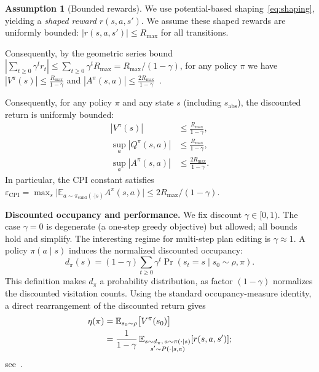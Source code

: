 \documentclass{article}
\theoremstyle{plain}
\theoremstyle{definition}
\newtheorem{assumption}[theorem]{Assumption}
\theoremstyle{remark}
\newcommand{\E}{\mathbb{E}}
\begin{document}
{\begin{assumption}[Bounded rewards]
\label{ass:bounded}
We use potential-based shaping~\eqref{eq:shaping}, yielding a \emph{shaped reward} $r(s,a,s')$.
We assume these shaped rewards are uniformly bounded: $|r(s,a,s')|\le R_{\max}$ for all transitions.

Consequently, by the geometric series bound $|\sum_{t\ge 0} \gamma^t r_t| \le \sum_{t\ge 0} \gamma^t R_{\max} = R_{\max}/(1-\gamma)$, for any policy $\pi$ we have
$|V^\pi(s)|\le \frac{R_{\max}}{1-\gamma}$ and $|A^\pi(s,a)|\le \frac{2R_{\max}}{1-\gamma}$~\citep[Ch.~3]{Puterman1994}.
\end{assumption}

Consequently, for any policy $\pi$ and any state $s$ (including $s_{\mathrm{abs}}$),
the discounted return is uniformly bounded:
\begin{equation}
\begin{aligned}
|V^\pi(s)| &\le \frac{R_{\max}}{1-\gamma}, \\
\sup_{a} |Q^\pi(s,a)| &\le \frac{R_{\max}}{1-\gamma}, \\
\sup_{a} |A^\pi(s,a)| &\le \frac{2R_{\max}}{1-\gamma}.
\end{aligned}
\label{eq:value_adv_bounds_from_Rmax}
\end{equation}
In particular, the CPI constant satisfies
$\varepsilon_{\mathrm{CPI}}=\max_s\bigl|\E_{a\sim\pi_{\mathrm{cand}}(\cdot|s)}A^\pi(s,a)\bigr|
\le 2R_{\max}/(1-\gamma)$.

\textbf{Discounted occupancy and performance.}
We fix discount $\gamma\in[0,1)$. The case $\gamma=0$ is degenerate (a one-step greedy objective) but allowed; all bounds hold and simplify. The interesting regime for multi-step plan editing is $\gamma\approx 1$.
A policy $\pi(a\mid s)$ induces the normalized discounted occupancy:
\begin{equation}
    d_\pi(s)
    =
    (1-\gamma)
    \sum_{t\ge 0}
    \gamma^t \Pr(s_t = s \mid s_0\sim\rho,\pi).
\end{equation}
This definition makes $d_\pi$ a probability distribution, as factor $(1-\gamma)$ normalizes the discounted visitation counts.
Using the standard occupancy-measure identity, a direct rearrangement of the discounted return gives
\begin{align}
\eta(\pi)
&=
\E_{s_0\sim\rho}\bigl[V^\pi(s_0)\bigr]
\notag\\
&=
\frac{1}{1-\gamma}\,
\E_{\substack{s\sim d_\pi,\, a\sim\pi(\cdot\mid s) \\ s'\sim P(\cdot\mid s,a)}}[r(s,a,s')];
\end{align}
see~\citet{KakadeLangford2002,Puterman1994}.

}
\end{document}
